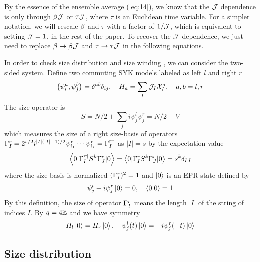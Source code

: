 \documentclass[11pt]{article}
\renewcommand{\>}{\rangle}
\newcommand{\<}{\langle}
\begin{document}
By the essence of the ensemble average (\ref{eq:14}), we know that
the $\mathcal{J}$ dependence is only through $\beta\mathcal{J}$ or $\tau\mathcal{J}$, where
$\tau$ is an Euclidean time variable. For a simpler notation, we
will rescale $\beta$ and $\tau$ with a factor of $1/\mathcal{J}$, which is
equivalent to setting $\mathcal{J}=1$, in the rest of the paper. To recover
the $\mathcal{J}$ dependence, we just need to replace $\beta\rightarrow\beta\mathcal{J}$ and $\tau\rightarrow\tau\mathcal{J}$
in the following equations.

In order to check size distribution and size winding \cite{Brown:2019hmk, Nezami:2021yaq}, we
can consider the two-sided system. Define two commuting SYK models
labeled as left $l$ and right $r$
\begin{equation}
\{\psi_{i}^{a},\psi_{j}^{b}\}=\delta^{ab}\delta_{ij},\quad H_{a}=\sum_{I}\mathcal{J}_{I}\mathcal{X}_{I}^{a},\quad a,b=l,r
\end{equation}
The size operator is 
\begin{equation}
S=N/2+\sum_{j}i\psi_{j}^{l}\psi_{j}^{r}=N/2+V
\end{equation}
which measures the size of a right size-basis of operators $\Gamma_{I}^{r}=2^{s/2}i^{|I|(|I|-1)/2}\psi_{i_{1}}^{r}\cdots\psi_{i_{s}}^{r}=\Gamma_{I}^{r\dagger}$
as $|I|=s$ by the expectation value \cite{Qi:2018bje}
\begin{equation}
\left\langle 0|\Gamma_{I}^{r\dagger}S^{k}\Gamma_{J}^{r}|0\right\rangle=\left\langle 0|\Gamma_{I}^{r}S^{k}\Gamma_{J}^{r}|0\right\rangle=s^{k}\delta_{IJ}\label{eq:34-1}
\end{equation}
where the size-basis is normalized $(\Gamma_{I}^{r})^{2}=1$ and $\left|0\right\rangle$
is an EPR state defined by
\begin{equation}
\psi_{j}^{l}+i\psi_{j}^{r}\left|0\right\rangle=0,\quad\left\langle 0|0\right\rangle=1
\end{equation}
By this definition, the size of operator $\Gamma_{I}^{r}$ means the length
$|I|$ of the string of indices $I$. By $q=4\mathbb{Z}$ and we have symmetry
\begin{equation}
H_{l}\left|0\right\rangle=H_{r}\left|0\right\rangle,\quad\psi_{j}^{l}(t)\left|0\right\rangle=-i\psi_{j}^{r}(-t)\left|0\right\rangle
\end{equation}


\subsection{Size distribution\label{subsec:Size-distribution}}
\end{document}
